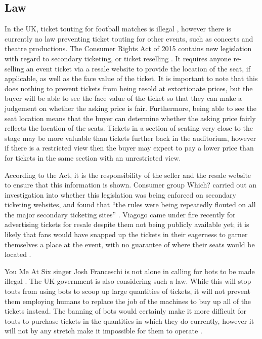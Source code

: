 \documentclass[12pt]{bhamdissertation}
\begin{document}
\subsection{Law}

In the UK, ticket touting for football matches is illegal \autocite{H94}, however there is currently no law preventing ticket touting for other events, such as concerts and theatre productions. The Consumer Rights Act of 2015 contains new legislation with regard to secondary ticketing, or ticket reselling \autocite{H15}. It requires anyone re-selling an event ticket via a resale website to provide the location of the seat, if applicable, as well as the face value of the ticket. It is important to note that this does nothing to prevent tickets from being resold at extortionate prices, but the buyer will be able to see the face value of the ticket so that they can make a judgement on whether the asking price is fair. Furthermore, being able to see the seat location means that the buyer can determine whether the asking price fairly reflects the location of the seats. Tickets in a section of seating very close to the stage may be more valuable than tickets further back in the auditorium, however if there is a restricted view then the buyer may expect to pay a lower price than for tickets in the same section with an unrestricted view.

According to the Act, it is the responsibility of the seller and the resale website to ensure that this information is shown. Consumer group Which? carried out an investigation into whether this legislation was being enforced on secondary ticketing websites, and found that ``the rules were being repeatedly flouted on all the major secondary ticketing sites'' \autocite{DJ16}. Viagogo came under fire recently for advertising tickets for resale despite them not being publicly available yet; it is likely that fans would have snapped up the tickets in their eagerness to garner themselves a place at the event, with no guarantee of where their seats would be located \autocite{Davi16}.

You Me At Six singer Josh Franceschi is not alone in calling for bots to be made illegal \autocite{Tr16}. The UK government is also considering such a law. While this will stop touts from using bots to scoop up large quantities of tickets, it will not prevent them employing humans to replace the job of the machines to buy up all of the tickets instead. The banning of bots would certainly make it more difficult for touts to purchase tickets in the quantities in which they do currently, however it will not by any stretch make it impossible for them to operate \autocite{S16}.
\end{document}
